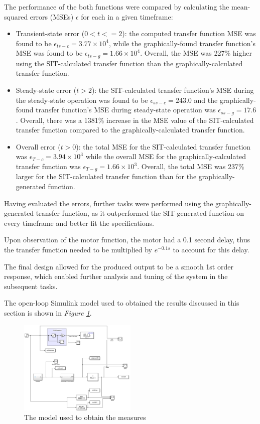 \documentclass[11pt, onecolumn]{article}
\begin{document}
\par The performance of the both functions were compared by calculating the mean-squared errors (MSEs) $\epsilon$ for each in a given timeframe:
\begin{itemize}
    \item Transient-state error ($0 < t <= 2$): the computed transfer function MSE was found to be $\epsilon_{ts-c} = 3.77 \times 10^4$, while the graphically-found transfer function's MSE was found to be $\epsilon_{ts-g} = 1.66 \times 10^4$. Overall, the MSE was 227\% higher using the SIT-calculated transfer function than the graphically-calculated transfer function.
    \item Steady-state error ($t > 2$): the SIT-calculated transfer function's MSE during the steady-state operation was found to be $\epsilon_{ss-c} = 243.0$ and the graphically-found transfer function's MSE during steady-state operation was $\epsilon_{ss-g} = 17.6$. Overall, there was a 1381\% increase in the MSE value of the SIT-calculated transfer function compared to the graphically-calculated transfer function.
    \item Overall error ($t > 0$): the total MSE for the SIT-calculated transfer function was $\epsilon_{T-c}=3.94\times10^{3}$ while the overall MSE for the graphically-calculated transfer function was $\epsilon_{T-g}=1.66\times10^{3}$. Overall, the total MSE was 237\% larger for the SIT-calculated transfer function than for the graphically-generated function.
\end{itemize}
\par Having evaluated the errors, further tasks were performed using the graphically-generated transfer function, as it outperformed the SIT-generated function on every timeframe and better fit the specifications.
\par Upon observation of the motor function, the motor had a 0.1 second delay, thus the transfer function needed to be multiplied by $e^{-0.1s}$ to account for this delay.
\par The final design allowed for the produced output to be a smooth 1st order response, which enabled further analysis and tuning of the system in the subsequent tasks.
\par The open-loop Simulink model used to obtained the results discussed in this section is shown in \textit{Figure \ref{fig:q1-model}}.\\
\begin{figure}[h!]
    \centering
    \includegraphics[width=0.5\textwidth]{q1-model.png}
    \caption{The model used to obtain the measures}
    \label{fig:q1-model}
\end{figure}
\end{document}
